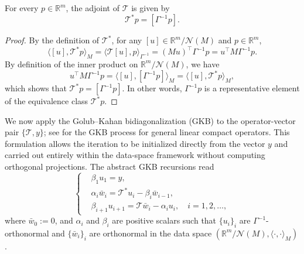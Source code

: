 \documentclass[]{myarticle}
\begin{document}
\begin{lemma}\label{lem:adjoint-TM}
For every $p\in\mathbb R^m$, the adjoint of $\mathcal T$ is given by
\begin{equation}\label{eq:adjoint-TM}
\mathcal T^\ast p = [\Gamma^{-1}p].
\end{equation}
\end{lemma}
\begin{proof}
By the definition of $\mathcal T^\ast$, for any $[u]\in \mathbb R^m/\mathcal N(M)$ and $p\in\mathbb R^m$,
\[\langle [u], \mathcal T^\ast p\rangle_M =
\langle \mathcal T[u], p\rangle_{\Gamma^{-1}}
= (Mu)^\top \Gamma^{-1}p = u^\top M \Gamma^{-1}p.\]
By definition of the inner product on $\mathbb R^m/\mathcal N(M)$, we have 
\[ u^\top M \Gamma^{-1}p = \langle [u],[\Gamma^{-1}p]\rangle_M
= \langle [u],\mathcal T^\ast p\rangle_M,
\]
which shows that $\mathcal T^\ast p = [\Gamma^{-1}p]$. In other words, $\Gamma^{-1}p$ is a representative element of the equivalence class $\mathcal T^\ast p$.
\end{proof}

We now apply the Golub--Kahan bidiagonalization (GKB) to the operator-vector pair $\{\mathcal T, y\}$; see \cite{caruso2019convergence} for the GKB process for general linear compact operators. This formulation allows the iteration to be initialized directly from the vector $y$ and carried out entirely within the data-space framework without computing orthogonal projections. The abstract GKB recursions read
\begin{equation}\label{eq:abstract-gGKB}
\left\{
\begin{aligned} 
& \beta_1 u_1 = y,\\
& \alpha_i\bar{w}_i = \mathcal T^\ast u_i - \beta_i \bar{w}_{i-1},\\
& \beta_{i+1} u_{i+1} = \mathcal T \bar{w}_i - \alpha_i u_i, \quad i=1, 2, \dots,
\end{aligned}
\right.
\end{equation}
where $\bar{w}_0:=0$, and $\alpha_i$ and $\beta_i$ are positive scalars such that $\{u_i\}_i$ are $\Gamma^{-1}$-orthonormal and $\{\bar{w}_i\}_i$ are orthonormal in the data space $(\mathbb R^m/\mathcal N(M),\langle\cdot,\cdot\rangle_M)$.
\end{document}
